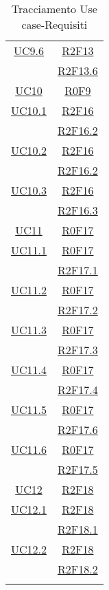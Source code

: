 \begin{longtable}{|c|c|}
\hline
\hyperlink{UC9.6}{UC9.6} & \hyperlink{R2F13}{R2F13}\\
& \hyperlink{R2F13.6}{R2F13.6}\\
\hline
\hyperlink{UC10}{UC10} & \hyperlink{R0F9}{R0F9}\\
\hline
\hyperlink{UC10.1}{UC10.1} & \hyperlink{R2F16}{R2F16}\\
& \hyperlink{R2F16.2}{R2F16.2}\\
\hline
\hyperlink{UC10.2}{UC10.2} & \hyperlink{R2F16}{R2F16}\\
& \hyperlink{R2F16.2}{R2F16.2}\\
\hline
\hyperlink{UC10.3}{UC10.3} & \hyperlink{R2F16}{R2F16}\\
& \hyperlink{R2F16.3}{R2F16.3}\\
\hline
\hyperlink{UC11}{UC11} & \hyperlink{R0F17}{R0F17}\\
\hline
\hyperlink{UC11.1}{UC11.1} & \hyperlink{R0F17}{R0F17}\\
& \hyperlink{R2F17.1}{R2F17.1}\\
\hline
\hyperlink{UC11.2}{UC11.2} & \hyperlink{R0F17}{R0F17}\\
& \hyperlink{R2F17.2}{R2F17.2}\\
\hline
\hyperlink{UC11.3}{UC11.3} & \hyperlink{R0F17}{R0F17}\\
& \hyperlink{R2F17.3}{R2F17.3}\\
\hline
\hyperlink{UC11.4}{UC11.4} & \hyperlink{R0F17}{R0F17}\\
& \hyperlink{R2F17.4}{R2F17.4}\\
\hline
\hyperlink{UC11.5}{UC11.5} & \hyperlink{R0F17}{R0F17}\\
& \hyperlink{R2F17.6}{R2F17.6}\\
\hline
\hyperlink{UC11.6}{UC11.6} & \hyperlink{R0F17}{R0F17}\\
& \hyperlink{R2F17.5}{R2F17.5}\\
\hline
\hyperlink{UC12}{UC12} & \hyperlink{R2F18}{R2F18}\\
\hline
\hyperlink{UC12.1}{UC12.1} & \hyperlink{R2F18}{R2F18}\\
& \hyperlink{R2F18.1}{R2F18.1}\\
\hline
\hyperlink{UC12.2}{UC12.2} & \hyperlink{R2F18}{R2F18}\\
& \hyperlink{R2F18.2}{R2F18.2}\\
\hline
\caption[Tracciamento Use case-Requisiti]{Tracciamento Use case-Requisiti}
\label{tabella:requi-usecase}
\end{longtable}
\clearpage
